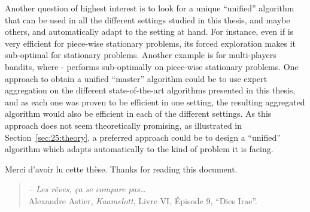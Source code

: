Another question of highest interest is to look for a unique ``unified'' algorithm that can be used in all the different settings studied in this thesis, and maybe others, and automatically adapt to the setting at hand.
For instance, even if \GLRklUCB{} is very efficient for piece-wise stationary problems, its forced exploration makes it sub-optimal for stationary problems.
Another example is for multi-players bandits, where \MCTopM-\klUCB{} performs sub-optimally on piece-wise stationary problems.
One approach to obtain a unified ``master'' algorithm could be to use expert aggregation on the different state-of-the-art algorithms presented in this thesis, and as each one was proven to be efficient in one setting, the resulting aggregated algorithm would also be efficient in each of the different settings.
As this approach does not seem theoretically promising, as illustrated in Section~\ref{sec:25:theory},
a preferred approach could be to design a ``unified'' algorithm which adapts automatically to the kind of problem it is facing.






\hr{}

\vfill{}


\begin{center}
    Merci d'avoir lu cette thèse.
    Thanks for reading this document.
\end{center}

\hr{}

\vfill{}


\begin{small}
\begin{quote}
    \emph{-- Les rêves, ça se compare pas\ldots}\\
    Alexandre Astier, \emph{Kaamelott}, Livre VI, Épisode 9, ``Dies Irae''.
\end{quote}
\end{small}
